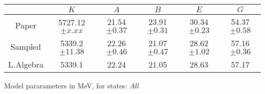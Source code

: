\begin{tabular}{c | c  c  c  c  c }\hline \hline
          & $K$        & $A$             & $B$     & $E$        & $G$            \\ \hline
Paper     & 5727.12$\pm x.xx$ & 21.54$\pm 0.37$ & 23.91$\pm 0.31$ & 30.34 $\pm 0.23$ & 54.37$\pm 0.58$ \\ 
Sampled   & 5339.2  $\pm 11.38 $ & 22.26  $\pm 0.46 $ & 21.07  $\pm 0.47 $ & 28.62  $\pm 1.02 $ & 57.16  $\pm 0.36 $ \\ 
L.Algebra & 5339.1  & 22.24  & 21.05  & 28.63 & 57.17  \\ 
\hline\hline
\end{tabular}
\caption{Model pararameters in MeV, for states: $ All $}

